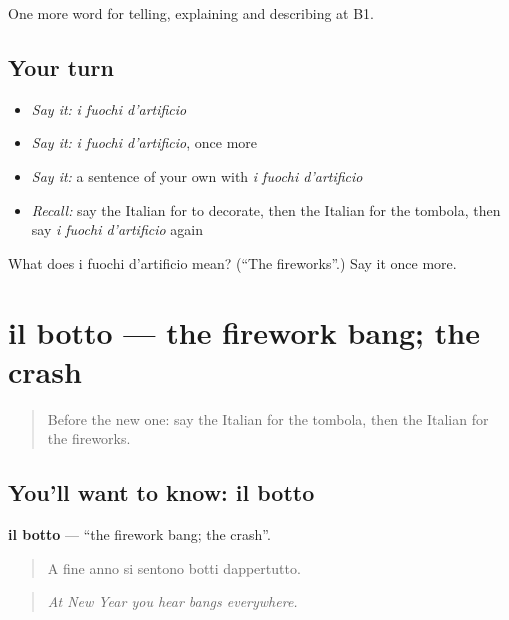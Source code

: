 \begin{grammarlens}[title={What you've built}]
One more word for telling, explaining and describing at B1.
\end{grammarlens}

\subsection*{Your turn}
\begin{itemize}
\raggedright
  \item \emph{Say it:} \emph{i fuochi d'artificio}
  \item \emph{Say it:} \emph{i fuochi d'artificio}, once more
  \item \emph{Say it:} a sentence of your own with \emph{i fuochi d'artificio}
  \item \emph{Recall:} say the Italian for to decorate, then the Italian for the tombola, then say \emph{i fuochi d'artificio} again
\end{itemize}

\begin{tcolorbox}[breakable,colback=teal!4,colframe=teal!35!black,title={Before you move on}]
What does i fuochi d'artificio mean? (\textquotedblleft{}The fireworks\textquotedblright{}.) Say it once more.
\end{tcolorbox}
\section[il botto]{il botto — the firework bang; the crash}

\label{lesson:IT-C322-botto}



\begin{quote}
Before the new one: say the Italian for the tombola, then the Italian for the fireworks.
\end{quote}

\subsection*{You'll want to know: il botto}
\textbf{il botto} — \textquotedblleft{}the firework bang; the crash\textquotedblright{}.

\begin{quote}
A fine anno si sentono botti dappertutto.
\end{quote}

\begin{quote}
\emph{At New Year you hear bangs everywhere.}
\end{quote}

